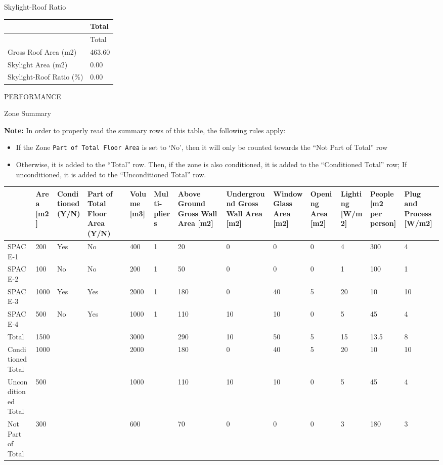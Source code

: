 Skylight-Roof Ratio

\begin{longtable}[c]{@{}ll@{}}
\toprule 
~ & Total \tabularnewline
\midrule
\endfirsthead

\toprule 
~ & Total \tabularnewline
\midrule
\endhead

Gross Roof Area (m2) & 463.60 \tabularnewline
Skylight Area (m2) & 0.00 \tabularnewline
Skylight-Roof Ratio (\%) & 0.00 \tabularnewline
\bottomrule
\end{longtable}

PERFORMANCE

Zone Summary

\textbf{Note:} In order to properly read the summary rows of this table, the following rules apply:

\begin{itemize}
    \item
        If the Zone \lstinline!Part of Total Floor Area! is set to `No', then it will only be counted towards the ``Not Part of Total'' row
    \item
        Otherwise, it is added to the ``Total'' row. Then, if the zone is also conditioned, it is added to the ``Conditioned Total'' row;
        If unconditioned, it is added to the ``Unconditioned Total'' row.
\end{itemize}

{\tiny
\begin{longtable}[c]{|p{0.8in}|p{0.25in}|p{0.50in}|p{0.35in}|p{0.30in}|p{0.30in}|p{0.35in}|p{0.5in}|p{0.30in}|p{0.30in}|p{0.30in}|p{0.35in}|p{0.35in}|}
\hline
 & Area {[}m2{]} & Conditioned (Y/N) & Part of Total Floor Area (Y/N) & Volume {[}m3{]} & Multi-pliers & Above Ground Gross Wall Area {[}m2{]} & Underground Gross Wall Area {[}m2{]} & Window Glass Area {[}m2{]} & Opening Area {[}m2{]} & Lighting {[}W/m2{]} & People {[}m2 per person{]} & Plug and Process {[}W/m2{]} \\ \hline
\endhead
%
SPACE-1 & 200 & {\color{DarkGreen}Yes} & {\color{red}No} & 400 & 1 & 20 & 0 & 0 & 0 & 4 & 300 & 4 \\ \hline
SPACE-2 & 100 & {\color{red}No} & {\color{red}No} & 200 & 1 & 50 & 0 & 0 & 0 & 1 & 100 & 1 \\ \hline
SPACE-3 & 1000 & {\color{DarkGreen}Yes} & {\color{DarkGreen}Yes} & 2000 & 1 & 180 & 0 & 40 & 5 & 20 & 10 & 10 \\ \hline
SPACE-4 & 500 & {\color{red}No} & {\color{DarkGreen}Yes} & 1000 & 1 & 110 & 10 & 10 & 0 & 5 & 45 & 4 \\ \hline
Total & 1500 &  &  & 3000 &  & 290 & 10 & 50 & 5 & 15 & 13.5 & 8 \\ \hline
Conditioned Total & 1000 &  &  & 2000 &  & 180 & 0 & 40 & 5 & 20 & 10 & 10 \\ \hline
Unconditioned Total & 500 &  &  & 1000 &  & 110 & 10 & 10 & 0 & 5 & 45 & 4 \\ \hline
Not Part of Total & 300 &  &  & 600 &  & 70 & 0 & 0 & 0 & 3 & 180 & 3 \\ \hline
\end{longtable}
}


